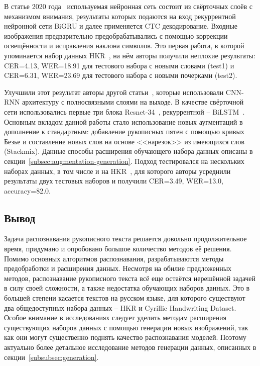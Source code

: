 В статье 2020 года~\cite{abdallah2020attention} используемая нейронная сеть состоит из свёрточных слоёв с механизмом внимания,
результаты которых подаются на вход рекуррентной нейронной сети BiGRU и далее применяется CTC декодирование.
Входные изображения предварительно предобрабатывались с помощью коррекции освещённости и исправления наклона символов.
Это первая работа, в которой упоминается набор данных HKR~\cite{nurseitov2021handwritten},
на нём авторы получили неплохие результаты: CER=4.13, WER=18.91 для тестового набора с новыми словами (test1) и
CER=6.31, WER=23.69 для тестового набора с новыми почерками (test2).

Улучшили этот результат авторы другой статьи~\cite{shonenkov2021stackmix}, которые использовали CNN-RNN архитектуру с полносвязными слоями на выходе.
В качестве свёрточной сети использовались первые три блока Resnet-34~\cite{he2016deep}, рекуррентной -- BiLSTM~\cite{hochreiter1997long}.
Основным вкладом данной работы стало использование новых аугментаций в дополнение к стандартным:
добавление рукописных пятен с помощью кривых Безье и составление новых слов на основе <<нарезок>> из имеющихся слов (Stackmix).
Данные способы расширения обучающего набора данных описаны в секции~\ref{subsec:augmentation-generation}.
Подход тестировался на нескольких наборах данных, в том числе и на HKR~\cite{nurseitov2021handwritten},
для которого авторы усреднили результаты двух тестовых наборов и получили CER=3.49, WER=13.0, accuracy=82.0.


\subsection{Вывод}
\label{subsec:review_conclusion}

Задача распознавания рукописного текста решается довольно продолжительное время,
придумано и опробовано большое количество методов её решения.
Помимо основных алгоритмов распознавания, разрабатываются методы предобработки и расширения данных.
Несмотря на обилие предложенных методов, распознавание рукописного текста всё еще остаётся нерешённой задачей в силу
своей сложности, а также недостатка обучающих наборов данных.
Это в большей степени касается текстов на русском языке, для которого существуют два общедоступных набора данных --
HKR и Cyrillic Handwriting Dataset.
Особое внимание в исследованиях следует уделить методам расширения существующих наборов данных с помощью генерации новых изображений,
так как они могут существенно поднять качество распознавания моделей.
Поэтому актуально более детальное исследование методов генерации данных, описанных в секции~\ref{subsubsec:generation}.
